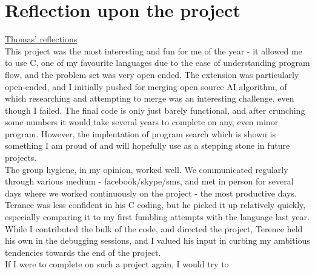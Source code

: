 \documentclass[11pt]{article}
\begin{document}
\section{Reflection upon the project}
\underline{Thomas' reflections}
\\
\indent This project was the most interesting and fun for me of the year - it allowed me to use C, one of my favourite languages due to the ease of understanding program flow, and the problem set was very open ended. The extension was particularly open-ended, and I initially pushed for merging open source AI algorithm, of which researching and attempting to merge was an interesting challenge, even though I failed. The final code is only just barely functional, and after crunching some numbers it would take several years to complete on any, even minor program. However, the implentation of program search which is shown is something I am proud of and will hopefully use as a stepping stone in future projects.
\\
\indent The group hygiene, in my opinion, worked well. We communicated regularly through various medium - facebook/skype/sms, and met in person for several days where we worked continuously on the project - the most productive days. Terance was less confident in his C coding, but he picked it up relatively quickly, especially comparing it to my first fumbling attempts with the language last year. While I contributed the bulk of the code, and directed the project, Terence held his own in the debugging sessions, and I valued his input in curbing my ambitious tendencies towards the end of the project. 
\\
\indent If I were to complete on such a project again, I would try to 
\end{document}
